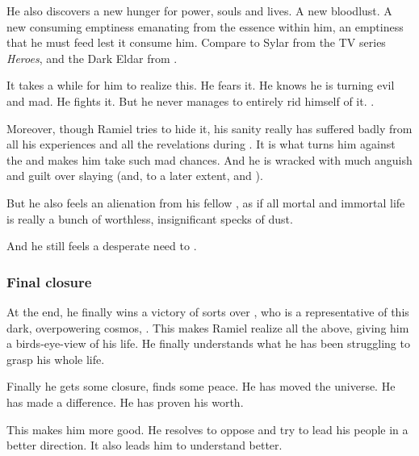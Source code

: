 He also discovers a new hunger for power, souls and lives.
A new bloodlust. 
A new consuming emptiness emanating from the \bane essence within him, an emptiness that he must feed lest it consume him.
Compare to Sylar from the TV series \emph{Heroes}, and the Dark Eldar from \cite{RPG:Warhammer40000:DarkEldar}.

It takes a while for him to realize this. 
He fears it. 
He knows he is turning evil and mad. 
He fights it. 
But he never manages to entirely rid himself of it. 
.

Moreover, though Ramiel tries to hide it, his sanity really has suffered badly from all his experiences and all the revelations during .
It is what turns him against the \banes and makes him take such mad chances.
And he is wracked with much anguish and guilt over slaying  (and, to a later extent,  and ).

But he also feels an alienation from his fellow \resphain, as if all mortal and immortal life is really a bunch of worthless, insignificant specks of dust.

And he still feels a desperate need to .






\subsubsection{Final closure}
At the end, he finally wins a victory of sorts over \Daggerrain, who is a representative of this dark, overpowering cosmos, . 
This makes Ramiel realize all the above, giving him a birds-eye-view of his life. 
He finally understands what he has been struggling to grasp his whole life. 

Finally he gets some closure, finds some peace. 
He has moved the universe. 
He has made a difference. 
He has proven his worth. 

This makes him more good. 
He resolves to oppose \Azraid{} and try to lead his people in a better direction. 
It also leads him to understand \Ishnaruchaefir{} better. 

